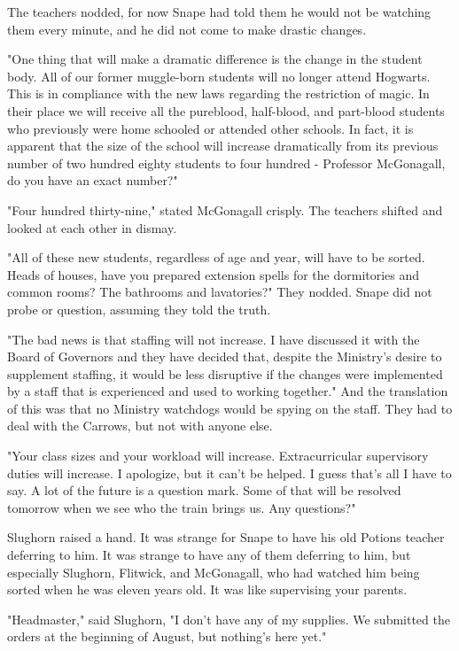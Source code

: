 The teachers nodded, for now Snape had told them he would not be watching them every minute, and he did not come to make drastic changes.

"One thing that will make a dramatic difference is the change in the student body. All of our former muggle-born students will no longer attend Hogwarts. This is in compliance with the new laws regarding the restriction of magic. In their place we will receive all the pureblood, half-blood, and part-blood students who previously were home schooled or attended other schools. In fact, it is apparent that the size of the school will increase dramatically from its previous number of two hundred eighty students to four hundred - Professor McGonagall, do you have an exact number?"

"Four hundred thirty-nine," stated McGonagall crisply. The teachers shifted and looked at each other in dismay.

"All of these new students, regardless of age and year, will have to be sorted. Heads of houses, have you prepared extension spells for the dormitories and common rooms? The bathrooms and lavatories?" They nodded. Snape did not probe or question, assuming they told the truth.

"The bad news is that staffing will not increase. I have discussed it with the Board of Governors and they have decided that, despite the Ministry's desire to supplement staffing, it would be less disruptive if the changes were implemented by a staff that is experienced and used to working together." And the translation of this was that no Ministry watchdogs would be spying on the staff. They had to deal with the Carrows, but not with anyone else.

"Your class sizes and your workload will increase. Extracurricular supervisory duties will increase. I apologize, but it can't be helped. I guess that's all I have to say. A lot of the future is a question mark. Some of that will be resolved tomorrow when we see who the train brings us. Any questions?"

Slughorn raised a hand. It was strange for Snape to have his old Potions teacher deferring to him. It was strange to have any of them deferring to him, but especially Slughorn, Flitwick, and McGonagall, who had watched him being sorted when he was eleven years old. It was like supervising your parents.

"Headmaster," said Slughorn, "I don't have any of my supplies. We submitted the orders at the beginning of August, but nothing's here yet."

